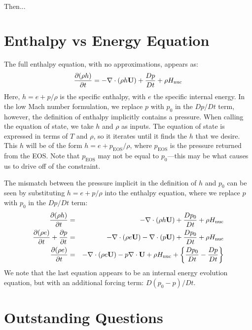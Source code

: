 Then...

\section{Enthalpy vs Energy Equation}

The full enthalpy equation, with no approximations, appears as:
\begin{equation}
\frac{\partial(\rho h)}{\partial t} = -\nabla\cdot(\rho h{\bf U}) + 
  \frac{Dp}{Dt} + \rho{H_{\rm nuc}} \label{eq:enthalpy}
\end{equation}
Here, $h = e + p/\rho$ is the specific enthalpy, with $e$ the specific
internal energy.  In the low Mach number formulation, we replace $p$
with $p_0$ in the $Dp/Dt$ term, however, the definition of enthalpy
implicitly contains a pressure.  When calling the equation of state,
we take $h$ and $\rho$ as inputs.  The equation of state is expressed
in terms of $T$ and $\rho$, so it iterates until it finds the $h$ that
we desire.  This $h$ will be of the form $h = e + p_\mathrm{EOS}/\rho$,
where $p_\mathrm{EOS}$ is the pressure returned from the EOS.  Note that
$p_\mathrm{EOS}$ may not be equal to $p_0$---this may be what
causes us to drive off of the constraint. 

The mismatch between the pressure implicit in the definition of $h$
and $p_0$ can be seen by substituting $h = e + p/\rho$ into the
enthalpy equation, where we replace $p$ with $p_0$ in the $Dp/Dt$ term:
\begin{eqnarray}
\frac{\partial(\rho h)}{\partial t} &=& -\nabla\cdot(\rho h\Ub) + 
  \frac{Dp_0}{Dt} + \rho\Hnuc \nonumber \\
%
\frac{\partial(\rho e)}{\partial t} + \frac{\partial p}{\partial t} &=&
 -\nabla\cdot(\rho e\Ub) -\nabla\cdot(p\Ub) + \frac{Dp_0}{Dt} + \rho\Hnuc \nonumber \\
%
\frac{\partial(\rho e)}{\partial t} &=&
 -\nabla\cdot(\rho e\Ub) - p\nabla\cdot\Ub + \rho\Hnuc + 
  \left \{ \frac{Dp_0}{Dt} - \frac{Dp}{Dt} \right \} \nonumber 
\end{eqnarray}
We note that the last equation appears to be an internal energy
evolution equation, but with an additional forcing term: $D(p_0 - p)/Dt$.

\section{Outstanding Questions}

